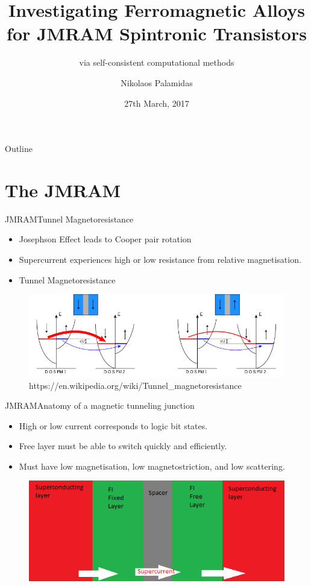 \documentclass{beamer}
\title{Investigating Ferromagnetic Alloys for JMRAM Spintronic Transistors}
\subtitle{via self-consistent computational methods}
\author{Nikolaos Palamidas}
\institute[] %
{
  \inst{}%
  Department of Physics\\
  King's College London
 }
\date{27th March, 2017}
\begin{document}
\begin{frame}
  \titlepage
\end{frame}
\begin{frame}{Outline}
  \tableofcontents
\end{frame}

\section{The JMRAM}

\begin{frame}{JMRAM}{Tunnel Magnetoresistance}
  \begin{itemize}
  \item {Josephson Effect leads to Cooper pair rotation}
  \item {Supercurrent experiences high or low resistance from relative magnetisation.}
  \item{Tunnel Magnetoresistance}
  \end{itemize}
 \begin{figure}[h!]
    \centering
    \begin{measuredfigure}
    \includegraphics[scale=0.4]{tmr}
    \caption{https://en.wikipedia.org/wiki/Tunnel\_magnetoresistance}
    \end{measuredfigure}
    \end{figure}
\end{frame}
\begin{frame}{JMRAM}{Anatomy of a magnetic tunneling junction}
  \begin{itemize}
      \item {High or low current corresponds to logic bit states.}
      \item{Free layer must be able to switch quickly and efficiently.}
      \item{Must have low magnetisation, low magnetostriction, and low scattering.}
  \end{itemize}
  \begin{figure}[h!]
    \centering
    \begin{measuredfigure}
    \includegraphics[scale=0.7]{mtj}
    \end{measuredfigure}
    \end{figure}
\end{frame}
\end{document}

